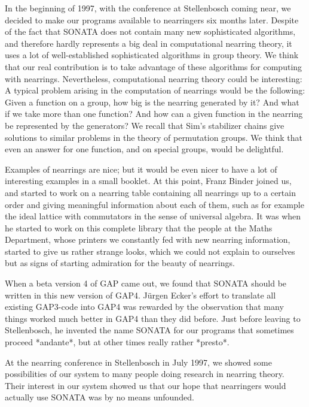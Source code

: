 In the beginning of 1997, with the conference at Stellenbosch coming
near, we decided to make our programs available to nearringers six
months later. Despite of the fact that SONATA does not contain many
new sophisticated algorithms, and therefore hardly represents a big
deal in computational nearring theory, it uses a lot of
well-established sophisticated algorithms in group theory.  We think
that our real contribution is to take advantage of these algorithms
for computing with nearrings.  Nevertheless, computational nearring
theory could be interesting: A typical problem arising in the
computation of nearrings would be the following: Given a function on
a group, how big is the nearring generated by it? And what if we take
more than one function? And how can a given function in the nearring
be represented by the generators? We recall that Sim's stabilizer
chains give solutions to similar problems in the theory of permutation
groups.  We think that even an answer for one function, and on special
groups, would be delightful.

Examples of nearrings are nice; but it would be even nicer to have a
lot of interesting examples in a small booklet. At this point, Franz
Binder joined us, and started to work on a nearring table containing
all nearrings up to a certain order and giving meaningful information
about each of them, such as for example the ideal lattice with
commutators in the sense of universal algebra.  It was when he started
to work on this complete library that the people at the Maths
Department, whose printers we constantly fed with new nearring
information, started to give us rather strange looks, which we could
not explain to ourselves but as signs of starting admiration for the
beauty of nearrings.

When a beta version 4 of GAP came out, we found that SONATA should be
written in this new version of GAP4. J\"urgen Ecker's effort to
translate all existing GAP3-code into GAP4 was rewarded by the
observation that many things worked much better in GAP4 than they did
before.  Just before leaving to Stellenbosch, he invented the name
SONATA for our programs that sometimes proceed *andante*, but at other
times really rather *presto*.

At the nearring conference in Stellenbosch in July 1997, we showed
some possibilities of our system to many people doing research in
nearring theory. Their interest in our system showed us that our hope
that nearringers would actually use SONATA was by no means unfounded.

